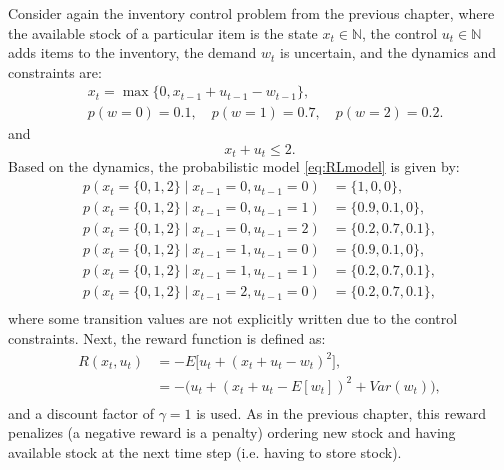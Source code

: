 \begin{example} \label{ex:RLDP}
\theoremstyle{definition}
Consider again the inventory control problem from the previous chapter, where the available stock of a particular item is the state $x_t \in \mathbb{N}$, the control $u_t \in \mathbb{N}$ adds items to the inventory, the demand $w_t$ is uncertain, and the dynamics and constraints are:
\begin{equation*}
\begin{split}
&x_{t} = \max \{0, x_{t-1} + u_{t-1} - w_{t-1}\}, \\
&p(w=0) = 0.1, \quad p(w = 1) = 0.7, \quad p(w = 2) = 0.2.
\end{split}
\end{equation*}
and
\begin{equation*}
x_t + u_t \leq 2.
\end{equation*}
Based on the dynamics, the probabilistic model \eqref{eq:RLmodel} is given by:
\begin{equation*}
\begin{split}
p(x_{t} = \{0, 1, 2\} \mid x_{t-1} = 0, u_{t-1} = 0) &= \{1, 0, 0\}, \\
p(x_{t} = \{0, 1, 2\} \mid x_{t-1} = 0, u_{t-1} = 1) &= \{0.9, 0.1, 0\}, \\
p(x_{t} = \{0, 1, 2\} \mid x_{t-1} = 0, u_{t-1} = 2) &= \{0.2, 0.7, 0.1\}, \\
p(x_{t} = \{0, 1, 2\} \mid x_{t-1} = 1, u_{t-1} = 0) &= \{0.9, 0.1, 0\}, \\
p(x_{t} = \{0, 1, 2\} \mid x_{t-1} = 1, u_{t-1} = 1) &= \{0.2, 0.7, 0.1\}, \\
p(x_{t} = \{0, 1, 2\} \mid x_{t-1} = 2, u_{t-1} = 0) &= \{0.2, 0.7, 0.1\}, \\
\end{split}
\end{equation*}
where some transition values are not explicitly written due to the control constraints.
Next, the reward function is defined as:
\begin{equation*}
\begin{split}
R(x_t,u_t) &= -E\big[u_t + (x_t + u_t - w_t)^2\big] , \\
&= -\big(u_t + (x_t + u_t - E[w_t])^2 + Var(w_t)\big), \\
\end{split}
\end{equation*}
and a discount factor of $\gamma=1$ is used. As in the previous chapter, this reward penalizes (a negative reward is a penalty) ordering new stock and having available stock at the next time step (i.e. having to store stock).


\end{example}
